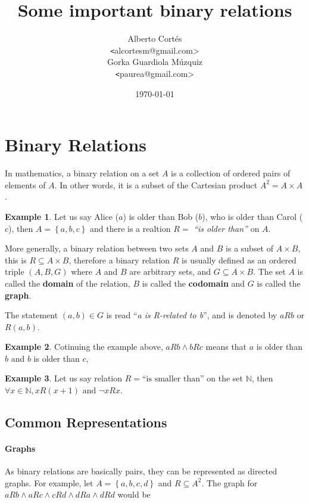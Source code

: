 \documentclass[11pt]{article}
\title{Some important binary relations}
\author{Alberto Cortés \\ {\texttt <alcortesm@gmail.com>}\\
Gorka Guardiola Múzquiz \\ {\texttt <paurea@gmail.com>}}
\date{\today}
\theoremstyle{plain}
\theoremstyle{definition}
\newtheorem*{example}{Example}
\begin{document}
\maketitle

\section{Binary Relations}

In mathematics, a binary relation on a set $A$ is a collection of ordered pairs of elements of $A$.
In other words, it is a subset of the Cartesian product $A^2 = A \times A$.

\begin{example}
  Let us say Alice ($a$) is older than Bob ($b$), who is older than Carol ($c$),
  then $A = \left\{a, b, c\right\}$ and
  there is a realtion $R =$ \textsl{``is older than''} on $A$.
\end{example}

More generally, a binary relation between two sets $A$ and $B$ is a subset of $A \times B$,
this is $R \subseteq A \times B$,
therefore a binary relation $R$ is usually defined as an ordered triple $(A, B, G)$
where $A$ and $B$ are arbitrary sets, and $G \subseteq A \times B$.
The set $A$ is called the \textbf{domain} of the relation,
$B$ is called the \textbf{codomain} and
$G$ is called the \textbf{graph}.

The statement $(a,b) \in G$ is read ``\textsl{a is R-related to b}'',
and is denoted by $aRb$ or $R(a,b)$.

\begin{example}
  Cotinuing the example above,
  $aRb \land bRc$ means that
  $a$ is older than $b$ and
  $b$ is older than $c$,
\end{example}

\begin{example}
  Let us say relation $R = \text{``is smaller than''}$ on the set $\mathbb{N}$,
  then $\forall x \in \mathbb{N}, xR(x+1) \text{ and } \neg xRx$.
\end{example}


\subsection{Common Representations}

\paragraph{Graphs} As binary relations are basically pairs,
they can be represented as directed graphs.
For example,
let $A = \left\{a, b, c, d\right\}$ and $R \subseteq A^2$.
The graph for $aRb \land aRc \land cRd \land dRa \land dRd$ would be
\begin{center}
  
\end{center}
\end{document}
